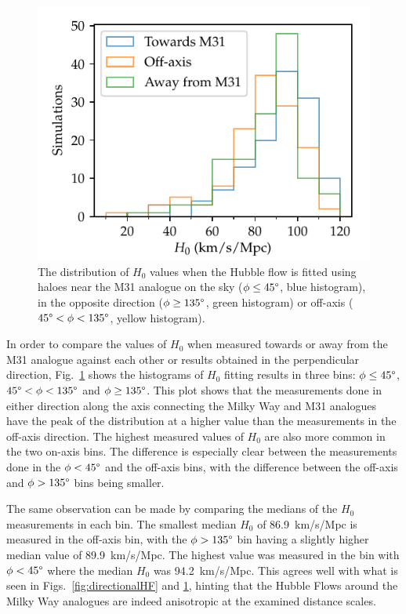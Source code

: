 \documentclass[english, oneside]{HYgradu}
\begin{document}
\begin{figure}
    \centering
    \includegraphics{kuvat/threeDirectionH0.pdf}
    \caption{The distribution of $H_0$ values when the Hubble flow is fitted using haloes near the M31 analogue on the sky ($\phi \leq 45 \degree$, blue histogram), in the opposite direction ($\phi \geq 135 \degree$, green histogram) or off-axis ($45 \degree < \phi < 135 \degree$, yellow histogram).}\label{fig:threeDirectionH0}
\end{figure}

In order to compare the values of $H_0$ when measured towards or away from the M31 analogue against each other or results obtained in the perpendicular direction, Fig.~\ref{fig:threeDirectionH0} shows the histograms of $H_0$ fitting results in three bins: $\phi \leq 45 \degree$, $45 \degree < \phi < 135 \degree$ and $\phi \geq 135 \degree$. This plot shows that the measurements done in either direction along the axis connecting the Milky Way and M31 analogues have the peak of the distribution at a higher value than the measurements in the off-axis direction. The highest measured values of $H_0$ are also more common in the two on-axis bins. The difference is especially clear between the measurements done in the $\phi < 45\degree$ and the off-axis bins, with the difference between the off-axis and $\phi > 135\degree$ bins being smaller.

The same observation can be made by comparing the medians of the $H_0$ measurements in each bin. The smallest median $H_0$ of 86.9~km/s/Mpc is measured in the off-axis bin, with the $\phi > 135\degree$ bin having a slightly higher median value of 89.9~km/s/Mpc. The highest value was measured in the bin with $\phi < 45\degree$ where the median $H_0$ was 94.2~km/s/Mpc. This agrees well with what is seen in Figs.~\ref{fig:directionalHF} and \ref{fig:threeDirectionH0}, hinting that the Hubble Flows around the Milky Way analogues are indeed anisotropic at the examined distance scales.
\end{document}
